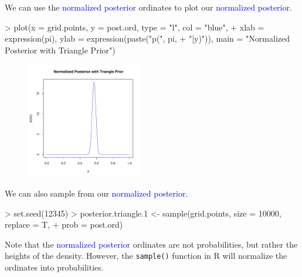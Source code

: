 \documentclass{beamer}
\begin{document}
\begin{frame}[fragile]
We can use the \textcolor{blue}{normalized posterior} ordinates to
plot our \textcolor{blue}{normalized posterior}.
\pause
\medskip
\tiny
\begin{Schunk}
\begin{Sinput}
> plot(x = grid.points, y = post.ord, type = "l", col = "blue", 
+     xlab = expression(pi), ylab = expression(paste("p(", pi, 
+         "|y)")), main = "Normalized Posterior with Triangle Prior")
\end{Sinput}
\end{Schunk}
\begin{figure}[!htp]
\begin{center}
\includegraphics[width = 2in, height = 2in]{grid-trianglepost.pdf}
\end{center}
\end{figure}
\normalsize
\end{frame}

\begin{frame}[fragile]
We can also sample from our \textcolor{blue}{normalized posterior}. 
\tiny
\medskip 
\pause
\begin{Schunk}
\begin{Sinput}
> set.seed(12345)
> posterior.triangle.1 <- sample(grid.points, size = 10000, replace = T, 
+     prob = post.ord)
\end{Sinput}
\end{Schunk}
\normalsize
\pause
\bigskip
Note that the \textcolor{blue}{normalized posterior} ordinates are not
probabilities, but rather the heights of the density.  \pause However, the
{\tt sample()} function in R will normalize the ordinates into probabilities.
\end{frame}
\end{document}
